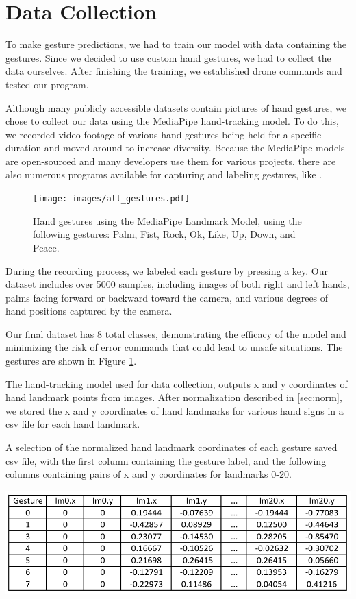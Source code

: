 \section{Data Collection}

To make gesture predictions, we had to train our model with data containing the gestures. Since we decided to use custom hand gestures, we had to collect the data ourselves. After finishing the training, we established drone commands and tested our program.

Although many publicly accessible datasets contain pictures of hand gestures, we chose to collect our data using the MediaPipe hand-tracking model. To do this, we recorded video footage of various hand gestures being held for a specific duration and moved around to increase diversity. Because the MediaPipe models are open-sourced and many developers use them for various projects, there are also numerous programs available for capturing and labeling gestures, like \cite{opencv_mediapipe_hand_gesture_recognition}.
\begin{figure}[h!]
	\centering
	\texttt{[image: images/all\_gestures.pdf]}
	\caption{Hand gestures using the MediaPipe Landmark Model, using the following gestures: Palm, Fist, Rock, Ok, Like, Up, Down, and Peace.}
	\label{fig:all_gestures}
\end{figure}


 During the recording process, we labeled each gesture by pressing a key. Our dataset includes over 5000 samples, including images of both right and left hands, palms facing forward or backward toward the camera, and various degrees of hand positions captured by the camera.



Our final dataset has 8 total classes, demonstrating the efficacy of the model and minimizing the risk of error commands that could lead to unsafe situations. The gestures are shown in Figure \ref{fig:all_gestures}.


The hand-tracking model used for data collection, outputs x and y coordinates of hand landmark points from images. After normalization described in \ref{sec:norm}, we stored the x and y coordinates of hand landmarks for various hand signs in a csv file for each hand landmark. 
\begin{table}[ht!]
\centering
\caption{A selection of the normalized hand landmark coordinates of each gesture saved csv file, with the first column containing the gesture label, and the following columns containing pairs of x and y coordinates for landmarks 0-20.}
\includegraphics[width = \textwidth]{images/gesture_laandmarks-cropped.pdf}
\label{tab:saved_csv} %
\end{table}


